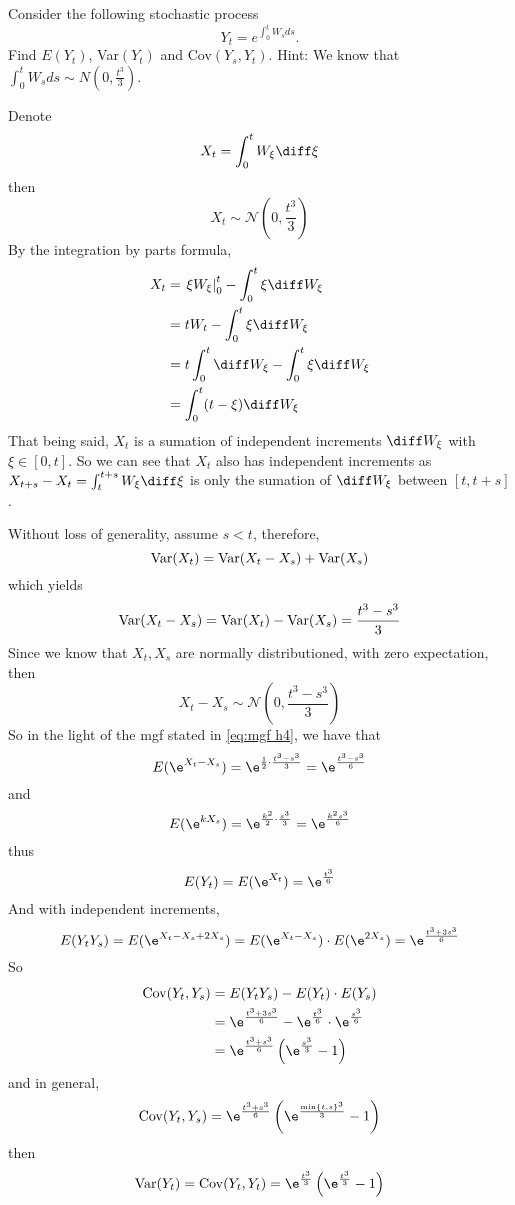     \problem
    \begin{question}
        Consider the following stochastic process
        \[Y_t=e^{\int_0^t W_sds}.\]
        Find $E(Y_t)$, Var$(Y_t)$ and Cov$(Y_s,Y_t)$. 
        Hint:  We know that $\int_0^t W_sds\sim N(0,\frac{t^3}{3})$.
    \end{question}
    Denote
    \[X_t=\int_0^tW_\xi\diff\xi\]
    then
    \[X_t\sim\mathcal N\left(0,\frac{t^3}{3}\right)\]
    By the integration by parts formula,
    \[\begin{aligned}
        X_t&=\left.\xi W_\xi\right|^t_0-\int_0^t\xi\diff W_\xi\\
        &=tW_t-\int_0^t\xi\diff W_\xi\\
        &=t\int_0^t\diff W_\xi-\int_0^t\xi\diff W_\xi\\
        &=\int_0^t(t-\xi)\diff W_\xi
    \end{aligned}\]
    That being said, $X_t$ is a sumation of independent increments
    $\diff W_\xi$ with $\xi\in[0,t]$. So we can see that $X_t$
    also has independent increments as
    $X_{t+s}-X_t=\int_t^{t+s}W_\xi\diff\xi$
    is only the
    sumation of $\diff W_\xi$ between $[t,t+s]$.

    Without loss of generality, assume $s<t$,
    therefore,
    \[\mathrm{Var}(X_t)=\mathrm{Var}(X_t-X_s)+\mathrm{Var}(X_s)\]
    which yields
    \[\mathrm{Var}(X_t-X_s)=\mathrm{Var}(X_t)-\mathrm{Var}(X_s)=\frac{t^3-s^3}{3}\]
    Since we know that $X_t,X_s$ are normally distributioned,
    with zero expectation, then
    \[X_t-X_s\sim\mathcal N\left(0,\frac{t^3-s^3}{3}\right)\]
    So in the light of the mgf stated in \cref{eq:mgf h4}, we have that
    \[E(\e^{X_t-X_s})=\e^{\frac{1}{2}\cdot\frac{t^3-s^3}{3}}
    =\e^{\frac{t^3-s^3}{6}}\]
    and
    \[E(\e^{kX_s})=\e^{\frac{k^2}{2}\cdot\frac{s^3}{3}}
    =\e^{\frac{k^2s^3}{6}}\]
    thus
    \[E(Y_t)=E(\e^{X_t})=\e^{\frac{t^3}{6}}\]
    And with independent increments,
    \[E(Y_tY_s)=E(\e^{X_t-X_s+2X_s})
    =E(\e^{X_t-X_s})\cdot E(\e^{2X_s})
    =\e^{\frac{t^3+3s^3}{6}}\]
    So
    \[\begin{aligned}
        \cov(Y_t,Y_s)&=E(Y_tY_s)-E(Y_t)\cdot E(Y_s)\\
        &=\e^{\frac{t^3+3s^3}{6}}-\e^{\frac{t^3}{6}}\cdot\e^\frac{s^3}{6}\\
        &=\e^{\frac{t^3+s^3}{6}}\left(\e^{\frac{s^3}{3}}-1\right)
    \end{aligned}\]
    and in general,
    \[\cov(Y_t,Y_s)=\e^{\frac{t^3+s^3}{6}}
    \left(\e^{\frac{\min\{t,s\}^3}{3}}-1\right)\]
    then
    \[\var(Y_t)=\cov(Y_t,Y_t)
    =\e^{\frac{t^3}{3}}\left(\e^{\frac{t^3}{3}}-1\right)\]

